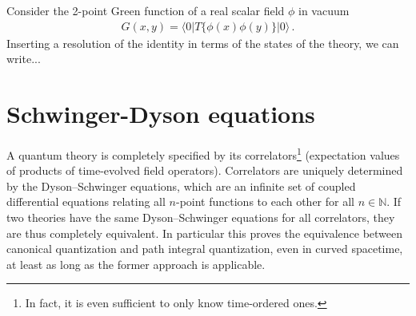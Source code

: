\documentclass[../QFT_main.tex]{subfiles}
\begin{document}
\begin{mytheorem}
Consider the 2-point Green function of a real scalar field $\phi$ in vacuum
\begin{align}
    G(x,y) = \langle 0|T\{\phi(x)\phi(y)\}|0\rangle\,.
\end{align}
Inserting a resolution of the identity in terms of the states of the theory, we can write...


\end{mytheorem}


\section{Schwinger-Dyson equations}


\begin{mytheorem}
A quantum theory is completely specified by its correlators\footnote{In fact, it is even sufficient to only know time-ordered ones.} (expectation values of products of time-evolved field operators).
Correlators are uniquely determined by the Dyson--Schwinger equations, which are an infinite set of coupled differential equations relating all $n$-point functions to each other for all $n\in\mathbb{N}$.
If two theories have the same Dyson--Schwinger equations for all correlators, they are thus completely equivalent.
In particular this proves the equivalence between canonical quantization and path integral quantization, even in curved spacetime, at least as long as the former approach is applicable.
\end{mytheorem}
\end{document}
